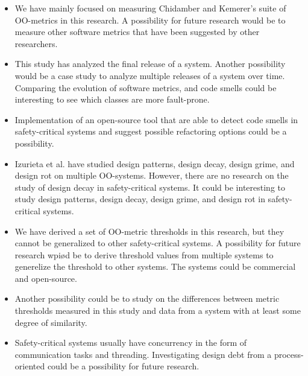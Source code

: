\begin{itemize}
	\item We have mainly focused on measuring Chidamber and Kemerer's suite of OO-metrics in this research. A possibility for future research would be to measure other software metrics that have been suggested by other researchers.

	\item This study has analyzed the final release of a system. Another possibility would be a case study to analyze multiple releases of a system over time. Comparing the evolution of software metrics, and code smells could be interesting to see which classes are more fault-prone.

	\item Implementation of an open-source tool that are able to detect code smells in safety-critical systems and suggest possible refactoring options could be a possibility. 

	\item Izurieta et al.\cite{izurieta2007software,izurieta2008testing,izurieta2013multiple} have studied design patterns, design decay, design grime, and design rot on multiple OO-systems. However, there are no research on the study of design decay in safety-critical systems. It could be interesting to study design patterns, design decay, design grime, and design rot in safety-critical systems.

	\item We have derived a set of OO-metric thresholds in this research, but they cannot be generalized to other safety-critical systems. A possibility for future research wpiød be to derive threshold values from multiple systems to generelize the threshold to other systems. The systems could be commercial and open-source.

	\item Another possibility could be to study on the differences between metric thresholds measured in this study and data from a system with at least some degree of similarity.

	\item Safety-critical systems usually have concurrency in the form of communication tasks and threading. Investigating design debt from a process-oriented could be a possibility for future research.
\end{itemize}

\cleardoublepage